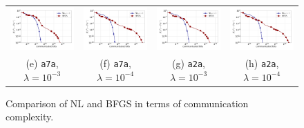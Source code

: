 \documentclass[12pt]{article}
\begin{document}
\begin{figure}[t]
\begin{center}
{\begin{tabular}{cccc}
				\includegraphics[width = 0.23 \textwidth]{LogReg/a7a/Lambda=1e-3/a7a_nl_bfgs_bits_lmb=0_001.pdf}&
				\includegraphics[width = 0.23 \textwidth]{LogReg/a7a/Lambda=1e-4/a7a_nl_bfgs_bits_lmb=0_0001.pdf}&
				\includegraphics[width = 0.23 \textwidth]{LogReg/a2a/Lambda=1e-3/a2a_nl_bfgs_bits_lmb=0_001.pdf}&
				\includegraphics[width = 0.23 \textwidth]{LogReg/a2a/Lambda=1e-4/a2a_nl_bfgs_bits_lmb=0_0001.pdf}
				\\
				(e) {\tt a7a}, $\lambda=10^{-3}$ &(f) {\tt a7a}, $\lambda=10^{-4}$ & (g) {\tt a2a}, $\lambda=10^{-3}$ &(h) {\tt a2a}, $\lambda=10^{-4}$
		\end{tabular}}
		\caption{Comparison of {\sf NL} and BFGS in terms of communication complexity.}
		\label{exp:bfgs}
	\end{center}
\end{figure}
\end{document}
